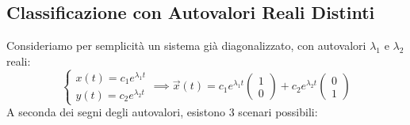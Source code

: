 \documentclass[openany]{book}
\theoremstyle{definition}
\theoremstyle{remark}
\begin{document}
\begin{center}
\end{center}

\subsection{Classificazione con Autovalori Reali Distinti}

Consideriamo per semplicità un sistema già diagonalizzato, con autovalori $\lambda_1$ e $\lambda_2$ reali:
\begin{equation}
    \begin{cases}
        x(t) = c_1 e^{\lambda_1 t} \\
        y(t) = c_2 e^{\lambda_2 t}
    \end{cases}
    \implies
    \vec{x}(t) = c_1 e^{\lambda_1 t} \begin{pmatrix} 1 \\ 0 \end{pmatrix} + c_2 e^{\lambda_2 t} \begin{pmatrix} 0 \\ 1 \end{pmatrix}
\end{equation}
A seconda dei segni degli autovalori, esistono 3 scenari possibili:
\end{document}
